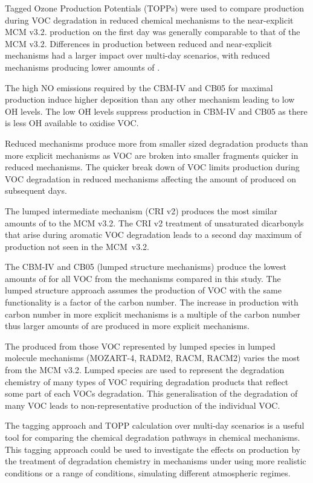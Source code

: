 Tagged Ozone Production Potentials (TOPPs) were used to compare  production during VOC degradation in reduced chemical mechanisms to the near-explicit MCM v3.2. 
 production on the first day was generally comparable to that of the MCM v3.2.
Differences in  production between reduced and near-explicit mechanisms had a larger impact over multi-day scenarios, with reduced mechanisms producing lower amounts of .

The high NO emissions required by the CBM-IV and CB05 for maximal  production induce higher  deposition than any other mechanism leading to low OH levels.
The low OH levels suppress  production in CBM-IV and CB05 as there is less OH available to oxidise VOC.

Reduced mechanisms produce more  from smaller sized degradation products than more explicit mechanisms as VOC are broken into smaller fragments quicker in reduced mechanisms.
The quicker break down of VOC limits  production during VOC degradation in reduced mechanisms affecting the amount of  produced on subsequent days.

The lumped intermediate mechanism (CRI v2) produces the most similar amounts of  to the MCM v3.2.
The CRI v2 treatment of unsaturated dicarbonyls that arise during aromatic VOC degradation leads to a second day maximum of  production not seen in the \mbox{MCM v3.2}.

The CBM-IV and CB05 (lumped structure mechanisms) produce the lowest amounts of  for all VOC from the mechanisms compared in this study.
The lumped structure approach assumes the  production of VOC with the same functionality is a factor of the carbon number.
The increase in  production with carbon number in more explicit mechanisms is a multiple of the carbon number thus larger amounts of  are produced in more explicit mechanisms.

The  produced from those VOC represented by lumped species in lumped molecule mechanisms (MOZART-4, RADM2, RACM, RACM2) varies the most from the MCM v3.2.
Lumped species are used to represent the degradation chemistry of many types of VOC requiring degradation products that reflect some part of each VOCs degradation.
This generalisation of the degradation of many VOC leads to non-representative  production of the individual VOC.

The tagging approach and TOPP calculation over multi-day scenarios is a useful tool for comparing the chemical degradation pathways in chemical mechanisms. 
This tagging approach could be used to investigate the effects on  production by the treatment of degradation chemistry in mechanisms under using more realistic  conditions or a range of  conditions, simulating different atmospheric regimes. 
